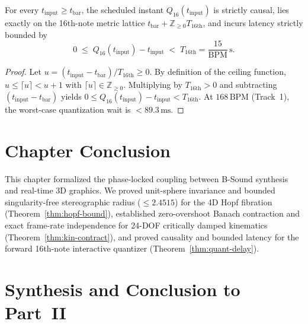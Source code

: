\begin{theorem}
\label{thm:quant-delay}
For every $t_{\mathrm{input}} \ge t_{\mathrm{bar}}$, the scheduled instant $Q_{16}(t_{\mathrm{input}})$ is strictly causal, lies exactly on the 16th-note metric lattice $t_{\mathrm{bar}} + \mathbb{Z}_{\ge 0} T_{\mathrm{16th}}$, and incurs latency strictly bounded by
\begin{equation}
0 \;\le\; Q_{16}(t_{\mathrm{input}}) - t_{\mathrm{input}} \;<\; T_{\mathrm{16th}} = \frac{15}{\mathrm{BPM}}\,\text{s}.
\end{equation}
\end{theorem}

\begin{proof}
Let $u = (t_{\mathrm{input}} - t_{\mathrm{bar}})/T_{\mathrm{16th}} \ge 0$. By definition of the ceiling function, $u \le \lceil u \rceil < u + 1$ with $\lceil u \rceil \in \mathbb{Z}_{\ge 0}$. Multiplying by $T_{\mathrm{16th}} > 0$ and subtracting $(t_{\mathrm{input}} - t_{\mathrm{bar}})$ yields $0 \le Q_{16}(t_{\mathrm{input}}) - t_{\mathrm{input}} < T_{\mathrm{16th}}$. At $168\,\text{BPM}$ (Track~1), the worst-case quantization wait is $< 89.3\,\text{ms}$.
\end{proof}

\section{Chapter Conclusion}

This chapter formalized the phase-locked coupling between B-Sound synthesis and real-time 3D graphics. We proved unit-sphere invariance and bounded singularity-free stereographic radius ($\le 2.4515$) for the 4D Hopf fibration (Theorem~\ref{thm:hopf-bound}), established zero-overshoot Banach contraction and exact frame-rate independence for 24-DOF critically damped kinematics (Theorem~\ref{thm:kin-contract}), and proved causality and bounded latency for the forward 16th-note interactive quantizer (Theorem~\ref{thm:quant-delay}).

\section*{Synthesis and Conclusion to Part~II}

